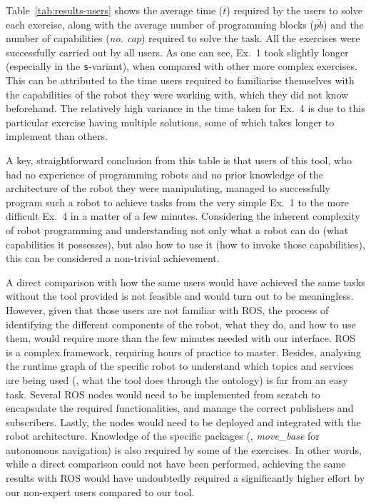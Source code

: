 Table~\ref{tab:results-users} shows the average time ($\overline{t}$) required by the users to solve each exercise, along with the average number of programming blocks ($\overline{pb}$) and the number of capabilities (\textit{no. cap}) required to solve the task. All the exercises were successfully carried out by all users. As one can see, Ex.~1 took slightly longer (especially in the \texttt{s}-variant), when compared with other more complex exercises. This can be attributed to the time users required to familiarise themselves with the capabilities of the robot they were working with, which they did not know beforehand. The relatively high variance in the time taken for Ex.~4 is due to this particular exercise having multiple solutions, some of which takes longer to implement than others. 

A key, straightforward conclusion from this table is that users of this tool, who had no experience of programming robots and no prior knowledge of the architecture of the robot they were manipulating, managed to successfully program such a robot to achieve tasks from the very simple Ex.~1 to the more difficult Ex.~4 in a matter of a few minutes. Considering the inherent complexity of robot programming and understanding not only what a robot can do (what capabilities it possesses), but also how to use it (how to invoke those capabilities), this can be considered a non-trivial achievement. 

A direct comparison with how the same users would have achieved the same tasks without the tool provided is not feasible and would turn out to be meaningless. However, given that those users are not familiar with ROS,  the process of identifying the different components of the robot, what they do, and how to use them, would require more than the few minutes needed with our interface. ROS is a complex framework, requiring hours of practice to master. Besides, analysing the runtime graph of the specific robot to understand which topics and services are being used (\ie, what the tool does through the ontology) is far from an easy task. Several ROS nodes would need to be implemented from scratch to encapsulate the required functionalities, and manage the correct publishers and subscribers. Lastly, the nodes would need to be deployed and integrated with the robot architecture. Knowledge of the specific packages (\eg, \textit{move\_base} for autonomous navigation) is also required by some of the exercises. In other words, while a direct comparison could not have been performed, achieving the same results with ROS would have undoubtedly required a significantly higher effort by our non-expert users compared to our tool.

